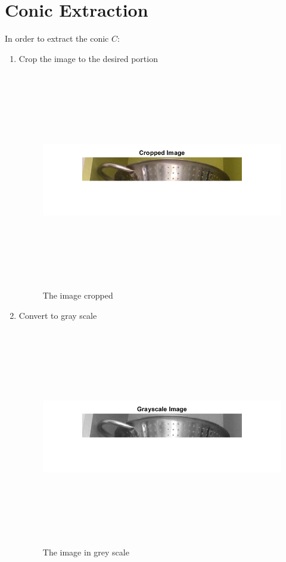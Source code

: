 \begin{enumerate}
    
\end{enumerate}

\section{Conic Extraction}
In order to extract the conic $C$:
\begin{enumerate}
    \item Crop the image to the desired portion
    \begin{figure}[H]
    \centering
    \includegraphics[height=9.5cm, width=\textwidth, keepaspectratio]{Report/Images/Features/Conic/CroppedImage.png}
    \caption{\label{fig:conic:cropped image}The image cropped}
    \end{figure}

    \item Convert to gray scale
    \begin{figure}[H]
    \centering
    \includegraphics[height=9.5cm, width=\textwidth, keepaspectratio]{Report/Images/Features/Conic/GrayscaleImage.png}
    \caption{\label{fig:conic:gray scale}The image in grey scale}
    \end{figure}


\end{enumerate}
